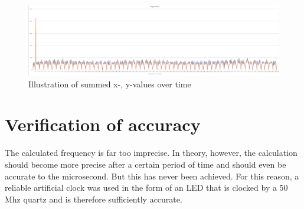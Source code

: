 \documentclass[12pt, a4paper]{report}
\begin{document}
    \bigskip
    
    \bigskip
    \noindent
    \begin{figure}
    \centering
    \includegraphics[scale=0.3]{Images/excel_sheet_graph.png}
    
    \caption{Illustration of summed x-, y-values over time}
    \end{figure}
    \bigskip

    \section{Verification of accuracy}
    The calculated frequency is far too imprecise. In theory, however, the calculation should become more precise after a certain period of time and should even be accurate to the microsecond.
    But this has never been achieved. For this reason, a reliable artificial clock was used in the form of an LED that is clocked by a 50 Mhz quartz and is therefore sufficiently accurate.
    
\end{document}
